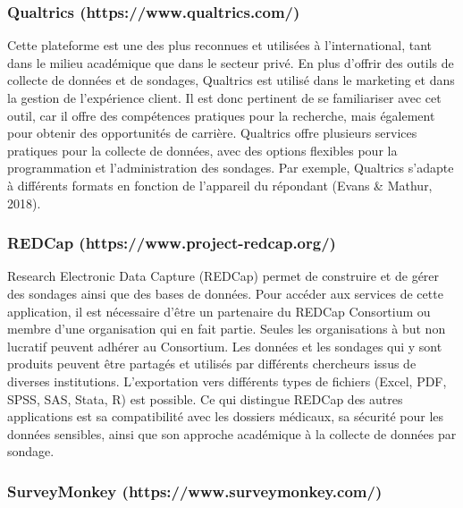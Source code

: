 \documentclass[
  letterpaper,
]{scrbook}
\begin{document}
\hypertarget{qualtrics-httpswww.qualtrics.com}{%
\subsubsection{Qualtrics
(https://www.qualtrics.com/)}\label{qualtrics-httpswww.qualtrics.com}}

\hfill\break
Cette plateforme est une des plus reconnues et utilisées à
l'international, tant dans le milieu académique que dans le secteur
privé. En plus d'offrir des outils de collecte de données et de
sondages, Qualtrics est utilisé dans le marketing et dans la gestion de
l'expérience client. Il est donc pertinent de se familiariser avec cet
outil, car il offre des compétences pratiques pour la recherche, mais
également pour obtenir des opportunités de carrière. Qualtrics offre
plusieurs services pratiques pour la collecte de données, avec des
options flexibles pour la programmation et l'administration des
sondages. Par exemple, Qualtrics s'adapte à différents formats en
fonction de l'appareil du répondant (Evans \& Mathur, 2018).

\hypertarget{redcap-httpswww.project-redcap.org}{%
\subsubsection{REDCap
(https://www.project-redcap.org/)}\label{redcap-httpswww.project-redcap.org}}

\hfill\break
Research Electronic Data Capture (REDCap) permet de construire et de
gérer des sondages ainsi que des bases de données. Pour accéder aux
services de cette application, il est nécessaire d'être un partenaire du
REDCap Consortium ou membre d'une organisation qui en fait partie.
Seules les organisations à but non lucratif peuvent adhérer au
Consortium. Les données et les sondages qui y sont produits peuvent être
partagés et utilisés par différents chercheurs issus de diverses
institutions. L'exportation vers différents types de fichiers (Excel,
PDF, SPSS, SAS, Stata, R) est possible. Ce qui distingue REDCap des
autres applications est sa compatibilité avec les dossiers médicaux, sa
sécurité pour les données sensibles, ainsi que son approche académique à
la collecte de données par sondage.

\hypertarget{surveymonkey-httpswww.surveymonkey.com}{%
\subsubsection{SurveyMonkey
(https://www.surveymonkey.com/)}\label{surveymonkey-httpswww.surveymonkey.com}}
\end{document}
